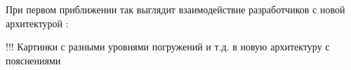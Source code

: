 При первом приближении так выглядит взаимодействие разработчиков с новой архитектурой :

!!! Картинки с разными уровнями погружений и т.д. в новую архитектуру с пояснениями

% 
% 
% 
